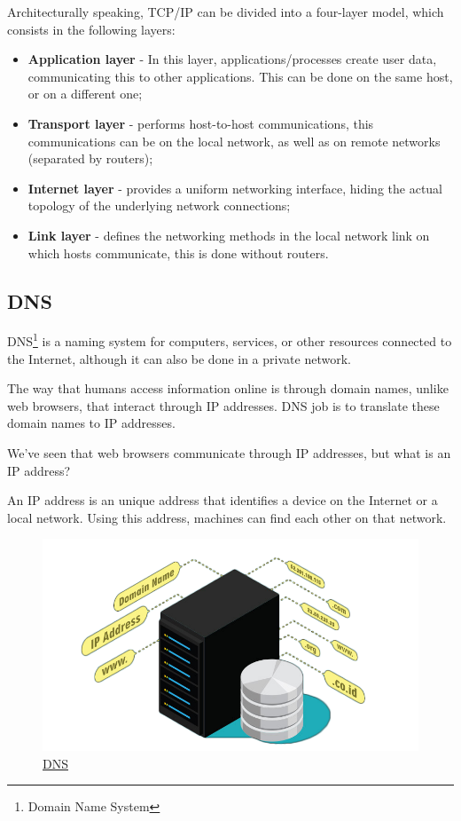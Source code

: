 \documentclass{article}
\newcommand\tab[1][1cm]{\hspace*{#1}}
\begin{document}
Architecturally speaking, TCP/IP can be divided into a four-layer model, which consists in the following layers:

\begin{itemize}
    \item \textbf{Application layer} - In this layer, applications/processes create user data, communicating this to other applications. This can be done on the same host, or on a different one;
    \item \textbf{Transport layer} - performs host-to-host communications, this communications can be on the local network, as well as on remote networks (separated by routers);
    \item \textbf{Internet layer} - provides a uniform networking interface, hiding the actual topology of the underlying network connections;
    \item \textbf{Link layer} - defines the networking methods in the local network link on which hosts communicate, this is done without routers.
\end{itemize}

\newpage

\subsection{DNS} 

\tab DNS\footnote{Domain Name System} is a naming system for computers, services, or other resources connected to the Internet, although it can also be done in a private network.

The way that humans access information online is through domain names, unlike web browsers, that interact through IP addresses. DNS job is to translate these domain names to IP addresses.

We've seen that web browsers communicate through IP addresses, but what is an IP address?

An IP address is an unique address that identifies a device on the Internet or a local network. Using this address, machines can find each other on that network.

\begin{figure}[H]
    \begin{center}
        \includegraphics[width=0.6 \textwidth]{images/dns.png}
        \caption{\href{https://www.google.com/url?sa=i&url=https\%3A\%2F\%2Fwww.pcmag.com\%2Fhow-to\%2Fhow-and-why-to-change-your-dns-server&psig=AOvVaw0kvZbAUtDVX3KBUpHmIdu4&ust=1617099982879000&source=images&cd=vfe&ved=0CAIQjRxqFwoTCPCEmYOl1e8CFQAAAAAdAAAAABAD}{\underline{DNS}}}
    \end{center}
\end{figure}
\end{document}
